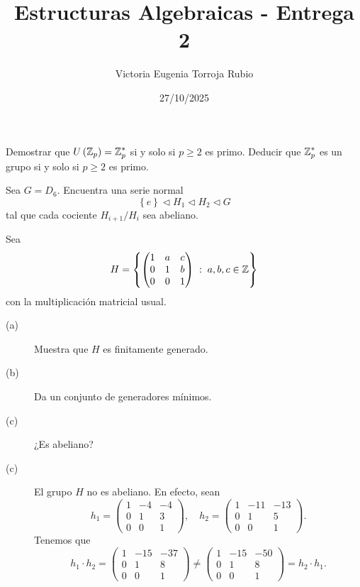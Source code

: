 \documentclass{article}
\begin{document}
\title{Estructuras Algebraicas - Entrega 2}
\author{Victoria Eugenia Torroja Rubio}
\date{27/10/2025}

\maketitle

\begin{ej}
Demostrar que $\displaystyle U\left(\mathbb{Z}_{p}\right) = \mathbb{Z}_{p}^{*} $ si y solo si $\displaystyle p \geq 2 $ es primo. Deducir que $\displaystyle \mathbb{Z}^{*}_{p} $ es un grupo si y solo si $\displaystyle p \geq 2 $ es primo.
\end{ej}

\begin{ej}
Sea $\displaystyle G = D_{6} $. Encuentra una serie normal
\[ \left\{ e\right\} \lhd H_{1} \lhd H_{2} \lhd G \]
tal que cada cociente $\displaystyle H_{i+1}/H_{i} $ sea abeliano.
\end{ej}

\begin{ej}
Sea 
\[H = \left\{ \begin{pmatrix} 1 & a & c \\ 0 & 1 & b \\ 0 & 0 & 1 \end{pmatrix} \; : \; a,b,c \in \mathbb{Z}\right\}  \]
con la multiplicación matricial usual.
\begin{description}
\item[(a)] Muestra que $\displaystyle H $ es finitamente generado.
\item[(b)] Da un conjunto de generadores mínimos.
\item[(c)] ¿Es abeliano?
\end{description}
\end{ej}

\begin{sol}
\begin{description}
\item[(c)] El grupo $\displaystyle H $ no es abeliano. En efecto, sean 
	\[h_{1} = \begin{pmatrix} 1 & -4 & -4 \\ 0 & 1 & 3 \\ 0 & 0 & 1 \end{pmatrix}, \quad h_{2} = \begin{pmatrix} 1 & -11 & -13 \\ 0 & 1 & 5 \\ 0 & 0 & 1 \end{pmatrix} .\]
	Tenemos que 
	\[h_{1} \cdot h_{2} = \begin{pmatrix} 1 & -15 & -37 \\ 0 & 1 & 8 \\ 0 & 0 & 1 \end{pmatrix} \neq \begin{pmatrix} 1 & -15 & -50 \\ 0 & 1 & 8 \\ 0 & 0 & 1 \end{pmatrix} = h_{2} \cdot h_{1} .\]
\end{description}
\end{sol}
\end{document}
